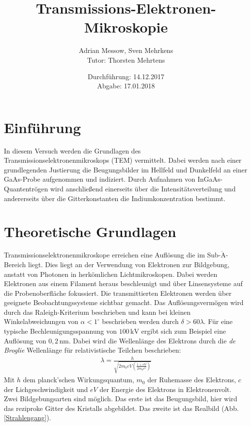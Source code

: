 \documentclass[a4paper,11pt,DIV=11]{scrartcl}
\title{Transmissions-Elektronen-Mikroskopie}
\author{Adrian Messow, Sven Mehrkens \\
Tutor: Thorsten Mehrtens}
\date{Durchführung: 14.12.2017 \\ Abgabe: 17.01.2018 }
\begin{document}
\maketitle
\section{Einführung}
In diesem Versuch werden die Grundlagen des Transmissionselektronenmikroskops (TEM) vermittelt. Dabei werden nach einer grundlegenden Justierung die Beugungsbilder im Hellfeld und Dunkelfeld an einer GaAs-Probe aufgenommen und indiziert. Durch Aufnahmen von InGaAs-Quantentrögen wird anschließend einerseits über die Intensitätsverteilung und andererseits über die Gitterkonstanten die Indiumkonzentration bestimmt.

\section{Theoretische Grundlagen}
Transmissionselektronenmikroskope erreichen eine Auflösung die im Sub-\(\mathrm{\mathring{A}}\)-Bereich liegt. Dies liegt an der Verwendung von Elektronen zur Bildgebung, anstatt von Photonen in herkömlichen Lichtmikroskopen. Dabei werden Elektronen aus einem Filament heraus beschleunigt und über Linsensysteme auf die Probenoberfläche fokussiert. Die transmittierten Elektronen werden über geeignete Beobachtungssysteme sichtbar gemacht. Das Auflösungsvermögen wird durch das Raleigh-Kriterium beschrieben und kann bei kleinen Winkelabweichungen von \(\alpha<1^\circ\) beschrieben werden durch \(\delta > 60\lambda\). Für eine typische Bechleunigungsspannung von \(100\,\mathrm{kV}\) ergibt sich zum Beispiel eine Auflösung von \(0,2\,\mathrm{nm}\). Dabei wird die Wellenlänge des Elektrons durch die \textit{de Broglie} Wellenlänge für relativistische Teilchen beschrieben: 
\begin{align}
\lambda = \frac{h}{\sqrt{2m_\mathrm{0}eV(\frac{1+eV}{2m_\mathrm{0}c^2})}}
\end{align}
Mit \(h\) dem planck'schen Wirkungsquantum, \(m_\mathrm{0}\) der Ruhemasse des Elektrons, \(c\) der Lichgeschwindigkeit und \(eV\) der Energie des Elektrons in Elektronenvolt.\\
Zwei Bildgebungsarten sind möglich. Das erste ist das Beugungsbild, hier wird das reziproke Gitter des Kristalls abgebildet. Das zweite ist das Realbild (Abb. \ref{Strahlengang}).
\end{document}

